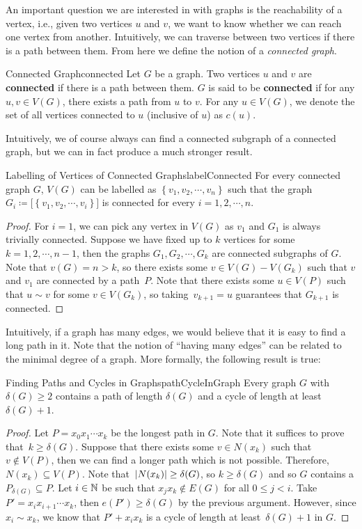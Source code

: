 \documentclass[math]{amznotes}
\theoremstyle{remark}
\newcommand{\0}{\mathbf{0}}
\newcommand{\1}{\mathbf{1}}
\begin{document}
An important question we are interested in with graphs is the reachability of a vertex, i.e., given two vertices $u$ and $v$, we want to know whether we can reach one vertex from another. Intuitively, we can traverse between two vertices if there is a path between them. From here we define the notion of a \textit{connected graph}.
\begin{dfnbox}{Connected Graph}{connected}
    Let $G$ be a graph. Two vertices $u$ and $v$ are {\color{red} \textbf{connected}} if there is a path between them. $G$ is said to be {\color{red} \textbf{connected}} if for any $u, v \in V(G)$, there exists a path from $u$ to $v$. For any $u \in V(G)$, we denote the set of all vertices connected to $u$ (inclusive of $u$) as $c(u)$.
\end{dfnbox}
Intuitively, we of course always can find a connected subgraph of a connected graph, but we can in fact produce a much stronger result.
\begin{probox}{Labelling of Vertices of Connected Graphs}{labelConnected}
    For every connected graph $G$, $V(G)$ can be labelled as $\left\{v_1, v_2, \cdots, v_n\right\}$ such that the graph~$G_i \coloneqq \bigl[\left\{v_1, v_2, \cdots, v_i\right\}\bigr]$ is connected for every $i = 1, 2, \cdots, n$.
    \tcblower
    \begin{proof}
        For $i = 1$, we can pick any vertex in $V(G)$ as $v_1$ and $G_1$ is always trivially connected. Suppose we have fixed up to $k$ vertices for some $k = 1, 2, \cdots, n - 1$, then the graphs $G_1, G_2, \cdots, G_k$ are connected subgraphs of $G$. Note that $v(G) = n > k$, so there exists some $v \in V(G) - V(G_k)$ such that $v$ and $v_1$ are connected by a path~$P$. Note that there exists some $u \in V(P)$ such that $u \sim v$ for some $v \in V(G_k)$, so taking~$v_{k + 1} = u$ guarantees that $G_{k + 1}$ is connected.
    \end{proof}
\end{probox}
Intuitively, if a graph has many edges, we would believe that it is easy to find a long path in it. Note that the notion of ``having many edges'' can be related to the minimal degree of a graph. More formally, the following result is true:
\begin{probox}{Finding Paths and Cycles in Graphs}{pathCycleInGraph}
    Every graph $G$ with $\delta(G) \geq 2$ contains a path of length $\delta(G)$ and a cycle of length at least $\delta(G) + 1$.
    \tcblower
    \begin{proof}
        Let $P = x_0x_1\cdots x_k$ be the longest path in $G$. Note that it suffices to prove that~$k \geq \delta(G)$. Suppose that there exists some $v \in N(x_k)$ such that $v \notin V(P)$, then we can find a longer path which is not possible. Therefore, $N(x_k) \subseteq V(P)$. Note that~${\left\lvert {N(x_k)} \right\rvert} \geq \delta(G)$, so $k \geq \delta(G)$ and so $G$ contains a $P_{\delta(G)} \subseteq P$. Let $i \in \mathbb{N}$ be such that $x_jx_k \notin E(G)$ for all $0 \leq j < i$. Take $P' = x_ix_{i + 1}\cdots x_k$, then $e(P') \geq \delta(G)$ by the previous argument. However, since $x_i \sim x_k$, we know that $P' + x_ix_k$ is a cycle of length at least~$\delta(G) + 1$ in $G$.
    \end{proof}
\end{probox}
\end{document}
